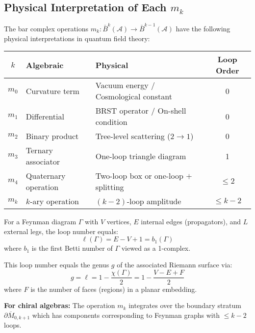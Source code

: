 \subsection{Physical Interpretation of Each $m_k$}

\begin{definition}
\label{def:mk-family-feynman}
The bar complex operations $m_k: \bar{B}^k(\mathcal{A}) \to \bar{B}^{k-1}(\mathcal{A})$ 
have the following physical interpretations in quantum field theory:

\begin{center}
\begin{tabular}{|c|p{4cm}|p{5cm}|c|}
\hline
\textbf{$k$} & \textbf{Algebraic} & \textbf{Physical} & \textbf{Loop Order} \\
\hline
$m_0$ & Curvature term & Vacuum energy / Cosmological constant & 0 \\
\hline
$m_1$ & Differential & BRST operator / On-shell condition & 0 \\
\hline
$m_2$ & Binary product & Tree-level scattering ($2 \to 1$) & 0 \\
\hline
$m_3$ & Ternary associator & One-loop triangle diagram & 1 \\
\hline
$m_4$ & Quaternary operation & Two-loop box or one-loop $+$ splitting & $\leq 2$ \\
\hline
$m_k$ & $k$-ary operation & $(k-2)$-loop amplitude & $\leq k-2$ \\
\hline
\end{tabular}
\end{center}
\end{definition}

\begin{theorem}[Loop Order = Genus Formula]
\label{thm:loop-genus-formula}
For a Feynman diagram $\Gamma$ with $V$ vertices, $E$ internal edges (propagators), 
and $L$ external legs, the loop number equals:
$$\ell(\Gamma) = E - V + 1 = b_1(\Gamma)$$
where $b_1$ is the first Betti number of $\Gamma$ viewed as a 1-complex.

This loop number equals the genus $g$ of the associated Riemann surface via:
$$g = \ell = 1 - \frac{\chi(\Gamma)}{2} = 1 - \frac{V - E + F}{2}$$
where $F$ is the number of faces (regions) in a planar embedding.

\textbf{For chiral algebras:} The operation $m_k$ integrates over the boundary stratum 
$\partial\overline{M}_{0,k+1}$ which has components corresponding to Feynman graphs with 
$\leq k-2$ loops.
\end{theorem}

